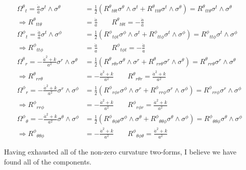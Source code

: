 \documentclass[a4paper, 11pt]{article}
\newenvironment{solution}{%
	\begin{list}{}{%
			\setlength{\topsep}{0pt}%
			\setlength{\leftmargin}{0.5cm}%
			\setlength{\rightmargin}{0.5cm}%
			\setlength{\listparindent}{\parindent}%
			\setlength{\itemindent}{\parindent}%
			\setlength{\parsep}{\parskip}%
		}%
		\item[]}{\end{list}}
\begin{document}
\begin{enumerate}[leftmargin=0em, label=\textbf{\arabic*}.]
\begin{solution}
\begin{align}
          \Omega^\theta{}_t = \frac{\ddot{a}}{a}\sigma^t\wedge\sigma^\theta &= \frac{1}{2}\left( R^\theta{}_{t\theta t}\sigma^\theta\wedge\sigma^t+R^\theta{}_{tt\theta}\sigma^t\wedge\sigma^\theta \right) = R^\theta{}_{tt\theta}\sigma^t\wedge\sigma^\theta\\
        \Rightarrow R^\theta{}_{tt\theta} &= \frac{\ddot{a}}{a} \qquad R^\theta{}_{t\theta t} = -\frac{\ddot{a}}{a} \\
           \Omega^\phi{}_t = \frac{\ddot{a}}{a}\sigma^t\wedge\sigma^\phi &= \frac{1}{2}\left( R^\phi{}_{t\phi t}\sigma^\phi\wedge\sigma^t+R^\phi{}_{tt\phi}\sigma^t\wedge\sigma^\phi \right) = R^\phi{}_{tt\phi}\sigma^t\wedge\sigma^\phi\\
        \Rightarrow R^\phi{}_{tt\phi} &= \frac{\ddot{a}}{a} \qquad R^\phi{}_{t\phi t} = -\frac{\ddot{a}}{a}  \\
        \Omega^\theta{}_r = -\frac{\dot{a}^2+k}{a^2}\sigma^r\wedge\sigma^\theta &= \frac{1}{2}\left( R^\theta{}_{r\theta r}\sigma^\theta\wedge\sigma^r+R^{\theta}{}_{rr\theta}\sigma^r\wedge\sigma^\theta \right) = R^\theta{}_{rr\theta}\sigma^r\wedge\sigma^\theta \\
        \Rightarrow R^\theta{}_{rr\theta}&= -\frac{\dot{a}^2+k}{a^2} \qquad R^\theta{}_{r\theta r} = \frac{\dot{a}^2+k}{a^2} \\
                \Omega^\phi{}_r = -\frac{\dot{a}^2+k}{a^2}\sigma^r\wedge\sigma^\phi &= \frac{1}{2}\left( R^\phi{}_{r\phi r}\sigma^\phi\wedge\sigma^r+R^{\phi}{}_{rr\phi}\sigma^r\wedge\sigma^\phi\right) = R^\phi{}_{rr\phi}\sigma^r\wedge\sigma^\phi\\
        \Rightarrow R^\phi{}_{rr\phi}&= -\frac{\dot{a}^2+k}{a^2} \qquad R^\phi{}_{r\phi r} = \frac{\dot{a}^2+k}{a^2} \\
                        \Omega^\phi{}_\theta = -\frac{\dot{a}^2+k}{a^2}\sigma^\theta\wedge\sigma^\phi &= \frac{1}{2}\left( R^\phi{}_{\theta\phi \theta}\sigma^\phi\wedge\sigma^\theta+R^{\phi}{}_{\theta\theta\phi}\sigma^\theta\wedge\sigma^\phi\right) = R^\phi{}_{\theta\theta\phi}\sigma^\theta\wedge\sigma^\phi\\
        \Rightarrow R^\phi{}_{\theta\theta\phi}&= -\frac{\dot{a}^2+k}{a^2} \qquad R^\phi{}_{\theta\phi \theta} = \frac{\dot{a}^2+k}{a^2} 
      \end{align}
      
      Having exhausted all of the non-zero curvature two-forms, I believe we
      have found all of the components.
    \end{solution}
   \newpage 


\end{enumerate}
\end{document}
